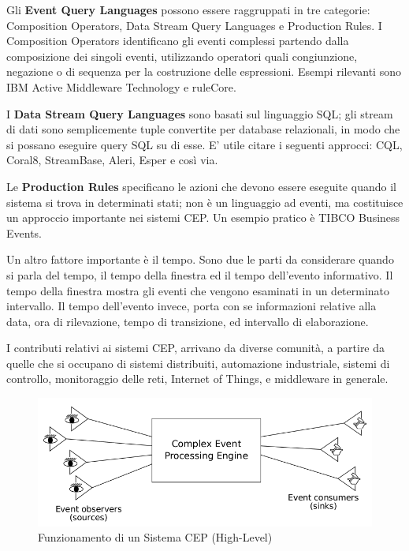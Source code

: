 \documentclass[12pt]{article}
\begin{document}
Gli \textbf{Event Query Languages} possono essere raggruppati in tre categorie: Composition Operators, Data Stream Query Languages e
Production Rules. I Composition Operators identificano gli eventi complessi partendo dalla composizione dei singoli eventi, utilizzando operatori quali congiunzione, negazione o di sequenza per la costruzione delle espressioni. Esempi rilevanti sono IBM Active Middleware Technology e ruleCore. 

I \textbf{Data Stream Query Languages} sono basati sul linguaggio SQL; gli stream di dati sono semplicemente tuple convertite per database relazionali, in modo che si possano eseguire query SQL su di esse. E' utile citare i seguenti approcci: CQL, Coral8, StreamBase,
Aleri, Esper e così via.

Le \textbf{Production Rules} specificano le azioni che devono essere eseguite quando il sistema si trova in determinati stati; non è un linguaggio ad eventi, ma costituisce un approccio importante nei sistemi CEP. Un esempio pratico è TIBCO Business Events.

Un altro fattore importante è il tempo. Sono due le parti da considerare quando si parla del tempo, il tempo della finestra ed il tempo dell'evento informativo. Il tempo della finestra mostra gli eventi che vengono esaminati in un determinato intervallo. Il tempo dell'evento invece, porta con se informazioni relative alla data, ora di rilevazione, tempo di transizione, ed intervallo di elaborazione.

I contributi relativi ai sistemi CEP, arrivano da diverse comunità, a partire da quelle che si occupano di sistemi distribuiti, automazione industriale, sistemi di controllo, monitoraggio delle reti, Internet of Things, e middleware in generale.

\begin{figure}[H]
	\centering
	\includegraphics[scale=0.40]{images/CEP.png}
	\caption{Funzionamento di un Sistema CEP (High-Level) \cite{Cugola:2012:PFI:2187671.2187677}}
	\label{funcep}
\end{figure}
\end{document}
